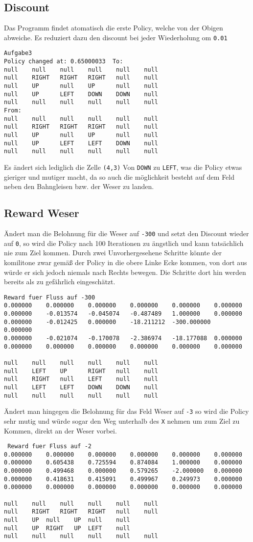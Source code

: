 \documentclass[a4paper]{article}
\begin{document}
\subsection{Discount}
Das Programm findet atomatisch die erste Policy, welche von der Obigen abweiche. Es reduziert dazu den discount bei jeder Wiederholung om \texttt{0.01}
\begin{lstlisting}
Aufgabe3
Policy changed at: 0.65000033  To:
null	null	null	null	null	null	
null	RIGHT	RIGHT	RIGHT	null	null	
null	UP		null	UP		null	null	
null	UP		LEFT	DOWN	DOWN	null	
null	null	null	null	null	null	
From: 
null	null	null	null	null	null	
null	RIGHT	RIGHT	RIGHT	null	null	
null	UP		null	UP		null	null	
null	UP		LEFT	LEFT	DOWN	null	
null	null	null	null	null	null	
\end{lstlisting}
Es ändert sich lediglich die Zelle \texttt{(4,3)} Von \texttt{DOWN} zu \texttt{LEFT}, was die Policy etwas gieriger und mutiger macht, da so auch die möglichkeit besteht auf dem Feld neben den Bahngleisen bzw. der Weser zu landen.

\subsection{Reward Weser}
Ändert man die Belohnung für die Weser auf \texttt{-300} und setzt den Discount wieder auf \texttt{0}, so wird die Policy nach 100 Iterationen zu ängstlich und kann tatsächlich nie zum Ziel kommen. Durch zwei Unvorhergesehene Schritte könnte der komilitone zwar gemäß der Policy in die obere Linke Ecke kommen, von dort aus würde er sich jedoch niemals nach Rechts bewegen. Die Schritte dort hin werden bereits als zu gefährlich eingeschätzt.
\begin{lstlisting}
Reward fuer Fluss auf -300
0.000000 	0.000000 	0.000000 	0.000000 	0.000000 	0.000000 	
0.000000 	-0.013574 	-0.045074 	-0.487489 	1.000000 	0.000000 	
0.000000 	-0.012425 	0.000000 	-18.211212 	-300.000000 	0.000000 	
0.000000 	-0.021074 	-0.170078 	-2.386974 	-18.177088 	0.000000 	
0.000000 	0.000000 	0.000000 	0.000000 	0.000000 	0.000000 	

null	null	null	null	null	null	
null	LEFT	UP		RIGHT	null	null	
null	RIGHT	null	LEFT	null	null	
null	LEFT	LEFT	DOWN	DOWN	null	
null	null	null	null	null	null	
\end{lstlisting}
Ändert man hingegen die Belohnung für das Feld Weser auf \texttt{-3} so wird die Policy sehr mutig und würde sogar den Weg unterhalb des \texttt{X} nehmen um zum Ziel zu Kommen, direkt an der Weser vorbei.
\begin{lstlisting}
 Reward fuer Fluss auf -2
0.000000 	0.000000 	0.000000 	0.000000 	0.000000 	0.000000 	
0.000000 	0.605438 	0.725594 	0.874084 	1.000000 	0.000000 	
0.000000 	0.499468 	0.000000 	0.579265 	-2.000000 	0.000000 	
0.000000 	0.418631 	0.415091 	0.499967 	0.249973 	0.000000 	
0.000000 	0.000000 	0.000000 	0.000000 	0.000000 	0.000000 	

null	null	null	null	null	null	
null	RIGHT	RIGHT	RIGHT	null	null	
null	UP	null	UP	null	null	
null	UP	RIGHT	UP	LEFT	null	
null	null	null	null	null	null	
\end{lstlisting}
\end{document}

